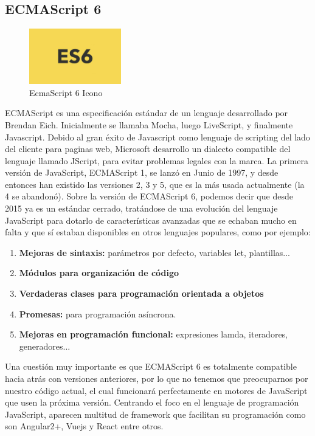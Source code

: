 \subsection{ECMAScript 6}
\begin{figure}[!h]
    \centering
    \includegraphics[width=40mm]{img/introduccion/ecma6.jpg}
    \caption{EcmaScript 6 Icono}
\end{figure}
ECMAScript es una especificación estándar de un lenguaje desarrollado por Brendan Eich. Inicialmente se llamaba Mocha, luego LiveScript, y finalmente Javascript. Debido al gran éxito de Javascript como lenguaje de scripting del lado del cliente para paginas web, Microsoft desarrollo un dialecto compatible del lenguaje llamado JScript, para evitar problemas legales con la marca.
La primera versión de JavaScript, ECMAScript 1, se lanzó en Junio de 1997, y desde entonces han existido las versiones 2, 3 y 5, que es la más usada actualmente (la 4 se abandonó). Sobre la versión de ECMAScript 6, podemos decir que desde 2015 ya es un estándar cerrado, tratándose de una evolución del lenguaje JavaScript para dotarlo de características avanzadas que se echaban mucho en falta y que sí estaban disponibles en otros lenguajes populares, como por ejemplo:
\begin{enumerate}
    \item \textbf{Mejoras de sintaxis: } parámetros por defecto, variables let, plantillas...
    \item \textbf{Módulos para organización de código }
    \item \textbf{Verdaderas clases para programación orientada a objetos  }
    \item \textbf{Promesas:  }para programación asíncrona.
    \item \textbf{Mejoras en programación funcional: } expresiones lamda, iteradores, generadores...
\end{enumerate}
Una cuestión muy importante es que ECMAScript 6 es totalmente compatible hacia atrás con versiones anteriores, por lo que no tenemos que preocuparnos por nuestro código actual, el cual funcionará perfectamente en motores de JavaScript que usen la próxima versión.
Centrando el foco en el lenguaje de programación JavaScript, aparecen multitud de framework que facilitan su programación como son Angular2+, Vuejs y React entre otros.
